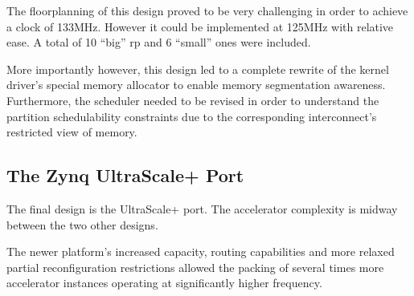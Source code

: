 The floorplanning of this design proved to be very challenging in order to achieve a clock of 133MHz.
However it could be implemented at 125MHz with relative ease. A total of 10 ``big'' \gls{rp} and
6 ``small'' ones were included.

More importantly however, this design led to a complete rewrite of the kernel driver's special memory allocator
to enable memory segmentation awareness. Furthermore, the scheduler needed to be revised in order to understand
the partition schedulability constraints due to the corresponding interconnect's restricted view of memory.


\subsection{The Zynq UltraScale+ Port}

The final design is the UltraScale+ port.
The accelerator complexity is midway between the two other designs.

The newer platform's increased capacity, routing capabilities
and more relaxed partial reconfiguration restrictions
allowed the packing of several times more accelerator instances
operating at significantly higher frequency.


